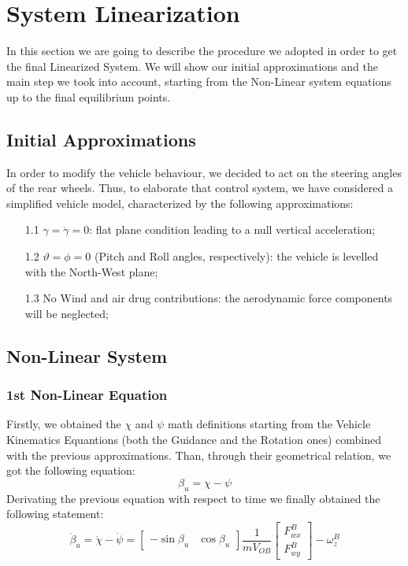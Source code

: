 \documentclass[a4paper,12pt,titlepage]{report}
\numberwithin{figure}{section}
\begin{document}
\chapter{System Linearization}
	In this section we are going to describe the procedure we adopted in order to get the final Linearized System. We will show our initial approximations and the main step we took into account, starting from the Non-Linear system equations up to the final equilibrium points. 
\section{Initial Approximations} \label{approx}	
	In order to modify the vehicle behaviour, we decided to act on the steering angles of the rear wheels. Thus, to elaborate that control system, we have considered a simplified vehicle model, characterized by the following approximations:
		\begin{itemize}
			\item[1.1] $ \gamma=\dot{\gamma}=0 $: flat plane condition leading to a null vertical acceleration;
			\item[1.2] $\vartheta = \phi = 0$ (Pitch and Roll angles, respectively): the vehicle is levelled with the North-West plane; 
			\item[1.3] No Wind and air drug contributions: the aerodynamic force components will be neglected;
		\end{itemize} 
\section{Non-Linear System}
\subsection{1st Non-Linear Equation} 	
	Firstly, we obtained the $\chi$ and $\psi$ math definitions starting from the Vehicle Kinematics Equantions (both the Guidance and the Rotation ones) combined with the previous approximations. Than, through their geometrical relation, we got the following equation:
		\begin{equation}
			\beta_{u} = \chi - \psi
		\end{equation}
	Derivating the previous equation with respect to time we finally obtained the following statement:
		\begin{equation} \label{Betaudot}
			\dot{\beta}_{u} = \dot\chi - \dot\psi = 
			\begin{bmatrix}
			- \sin\beta_{u} & \cos\beta_{u}
			\end{bmatrix}
			\frac{1}{mV_{OB}}
			\begin{bmatrix}
			F_{wx}^{B} \\ F_{wy}^{B}
			\end{bmatrix}
			-\omega_{z}^{B}
		\end{equation}
\end{document}
